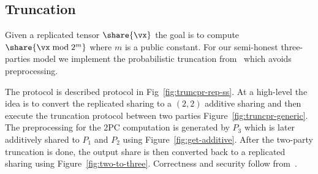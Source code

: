 \subsection{Truncation}
\label{subsec:truncation}

Given a replicated tensor $\share{\vx}$ the goal is to compute $\share{\vx \bmod 2^m}$ where $m$ is a public constant. 
For our semi-honest three-parties model we implement the probabilistic truncation from~\cite{PoPETS:DalEscKel20} which avoids preprocessing.

The protocol is described protocol in Fig~\ref{fig:truncpr-rep-ss}. At a high-level the idea is to convert the replicated sharing to a $(2,2)$ additive sharing and then execute the truncation protocol between two parties Figure~\ref{fig:truncpr-generic}. The preprocessing for the 2PC computation is generated by $P_3$ which is later additively shared to $P_1$ and $P_2$ using Figure~\ref{fig:get-additive}. After the two-party truncation is done, the output share is then converted back to a replicated sharing using Figure~\ref{fig:two-to-three}. Correctness and security follow from~\cite{PoPETS:DalEscKel20}.


